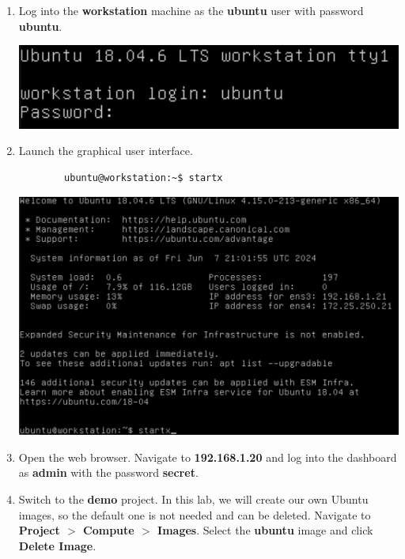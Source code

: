 \documentclass[letterpaper, 12pt]{article}
\begin{document}
\begin{enumerate}
    \item Log into the \textbf{workstation} machine as the \textbf{ubuntu} user with password \textbf{ubuntu}.

    \begin{center}
        \includegraphics[width=\linewidth]{images/part1/step1.png}
    \end{center}

    \item Launch the graphical user interface.
    \begin{lstlisting}
        ubuntu@workstation:~$ startx
    \end{lstlisting}

    \begin{center}
        \includegraphics[width=\linewidth]{images/part1/step2.png}
    \end{center}

    \item Open the web browser. Navigate to \textbf{192.168.1.20} and log into the dashboard as \textbf{admin} with the
    password \textbf{secret}.

    \item Switch to the \textbf{demo} project. In this lab, we will create our own Ubuntu images, so the default one is
    not needed and can be deleted. Navigate to \textbf{Project $>$ Compute $>$ Images}. Select the \textbf{ubuntu} image
    and click \textbf{Delete Image}.


\end{enumerate}
\end{document}

